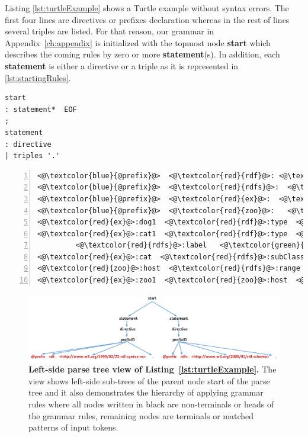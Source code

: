 
Listing \ref{lst:turtleExample} shows a Turtle example without syntax errors. 
The first four lines are directives or prefixes declaration whereas in the rest of lines several triples are listed.  
For that reason, our grammar in Appendix~\ref{ch:appendix} is initialized with the topmost node \textbf{start} which describes the coming rules by zero or more  \textbf{statement}(s). 
In addition, each \textbf{statement} is either a directive or a triple as it is represented in \ref{lst:startingRules}.

\begin{lstlisting}[label=lst:startingRules, caption={Starting rules in the grammar file}] 
start
: statement*  EOF
;
statement
: directive
| triples '.'
\end{lstlisting}

\begin{lstlisting}[label=lst:turtleExample, numbers=left, caption={RDF example in Turtle serialization format}]
<@\textcolor{blue}{@prefix}@>  <@\textcolor{red}{rdf}@>: <@\textcolor{orange}{<http://www.w3.org/1999/02/22-rdf-syntax-ns\#>}@> .
<@\textcolor{blue}{@prefix}@>  <@\textcolor{red}{rdfs}@>:  <@\textcolor{orange}{<http://www.w3.org/2000/01/rdf-schema\#>}@> .
<@\textcolor{blue}{@prefix}@>  <@\textcolor{red}{ex}@>:  <@\textcolor{orange}{<http://example.org/>}@> .
<@\textcolor{blue}{@prefix}@>  <@\textcolor{red}{zoo}@>:   <@\textcolor{orange}{<http://example.org/zoo/> }@> .
<@\textcolor{red}{ex}@>:dog1  <@\textcolor{red}{rdf}@>:type  <@\textcolor{red}{ex}@>:animal .
<@\textcolor{red}{ex}@>:cat1  <@\textcolor{red}{rdf}@>:type  <@\textcolor{red}{ex}@>:cat ;
         <@\textcolor{red}{rdfs}@>:label   <@\textcolor{green}{"Lusi"@en}@> .
<@\textcolor{red}{ex}@>:cat  <@\textcolor{red}{rdfs}@>:subClassOf  <@\textcolor{red}{ex}@>:animal .
<@\textcolor{red}{zoo}@>:host  <@\textcolor{red}{rdfs}@>:range  <@\textcolor{red}{ex}@>:animal .
<@\textcolor{red}{ex}@>:zoo1  <@\textcolor{red}{zoo}@>:host  <@\textcolor{red}{ex}@>:cat2 .
\end{lstlisting}



\begin{figure}
		\centering\includegraphics[width=1.12\linewidth]{images/implementationParseTreeLeft.png}
		\caption{\textbf{Left-side parse tree view of Listing~\ref{lst:turtleExample}.} The view shows left-side sub-trees of the parent node start of the parse tree and it also demonstrates the hierarchy of applying grammar rules where all nodes written in black are non-terminals or heads of the grammar rules, remaining nodes are terminals or matched patterns of input tokens.}
	\label{Fig:implementationParseTreeLeft}
\end{figure}

